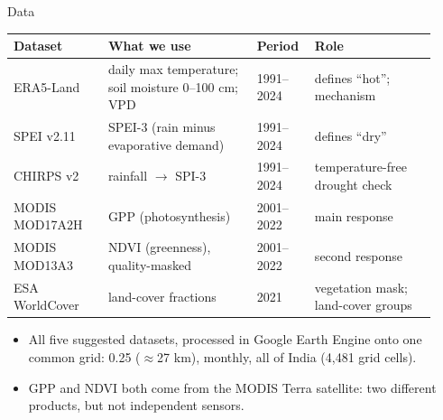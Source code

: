 \documentclass[11pt,aspectratio=169]{beamer}
\begin{document}
\begin{frame}{Data}
  \scriptsize
  \renewcommand{\arraystretch}{0.95}
  \begin{tabular}{@{}L{0.21\linewidth}L{0.33\linewidth}L{0.12\linewidth}L{0.27\linewidth}@{}}
    \toprule
    \textbf{Dataset} & \textbf{What we use} & \textbf{Period} & \textbf{Role} \\
    \midrule
    ERA5-Land \citep{munozsabater2021} & daily max temperature; soil moisture 0--100 cm; VPD & 1991--2024 & defines ``hot''; mechanism \\
    SPEI v2.11 \citep{vicenteserrano2010} & SPEI-3 (rain minus evaporative demand) & 1991--2024 & defines ``dry'' \\
    CHIRPS v2 \citep{funk2015} & rainfall $\rightarrow$ SPI-3 & 1991--2024 & temperature-free drought check \\
    MODIS MOD17A2H \citep{running2015,running2004} & GPP (photosynthesis) & 2001--2022 & main response \\
    MODIS MOD13A3 \citep{didan2021} & NDVI (greenness), quality-masked & 2001--2022 & second response \\
    ESA WorldCover \citep{zanaga2022} & land-cover fractions & 2021 & vegetation mask; land-cover groups \\
    \bottomrule
  \end{tabular}

  \vspace{6pt}
  \begin{itemize}
    \item All five suggested datasets, processed in Google Earth Engine
      \citep{gorelick2017} onto one common grid: 0.25\textdegree{} ($\approx$27 km),
      monthly, all of India (4,481 grid cells).
    \item GPP and NDVI both come from the MODIS Terra satellite: two
      different products, but not independent sensors.
  \end{itemize}
\end{frame}
\end{document}
